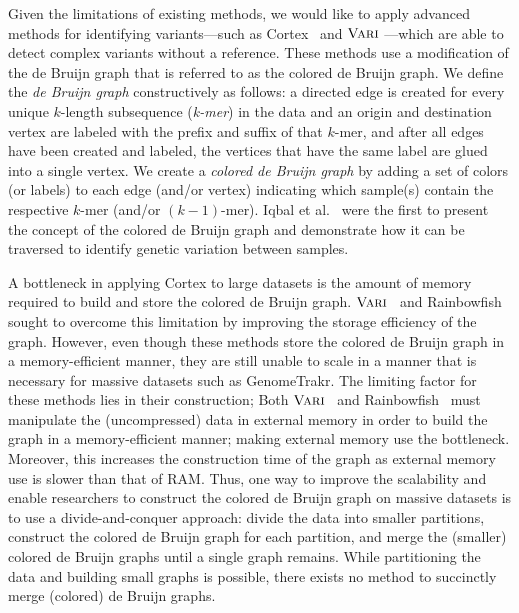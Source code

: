 Given the limitations of existing methods, we would like to apply advanced methods for identifying variants---such as Cortex~\cite{ICTFM12} and $\mbox{\rm {\sc Vari}}$ \cite{vari}---which are able to detect complex variants without a reference. These methods use a modification of the de Bruijn graph that is referred to as the colored de Bruijn graph.   We define the {\em de Bruijn graph} constructively as follows: a directed edge is created for every unique $k$-length subsequence ({\em k-mer}) in the data and an origin and destination vertex are labeled with the prefix and suffix of that $k$-mer, and after all edges have been created and labeled, the vertices that have the same label are glued into a single vertex.  We create a {\em colored de Bruijn graph} by adding a set of colors (or labels) to each edge (and/or vertex) indicating which sample(s) contain the respective $k$-mer (and/or $(k - 1)$-mer).  Iqbal et al.~\cite{ICTFM12} were the first to present the concept of the colored de Bruijn graph and demonstrate how it can be traversed to identify genetic variation between samples.

A bottleneck in applying Cortex to large datasets is the amount of memory required to build and store the colored de Bruijn graph.   $\mbox{\rm {\sc Vari}}$~\cite{vari} and Rainbowfish~\cite{rainbowfish} sought to overcome this limitation by improving the storage efficiency of the graph.  However, even though these methods store the colored de Bruijn graph in a memory-efficient manner, they are still unable to scale in a manner that is necessary for massive datasets such as GenomeTrakr.  The limiting factor for these methods  lies in their construction; Both $\mbox{\rm {\sc Vari}}$~\cite{vari} and Rainbowfish~\cite{rainbowfish} must manipulate the (uncompressed) data in external memory in order to build the graph in a memory-efficient manner; making  external memory use the bottleneck.  Moreover, this increases the construction time of the graph as external memory use is slower than that of RAM.  Thus, one way to improve the scalability and enable researchers to construct the colored de Bruijn graph on  massive datasets is to use a divide-and-conquer approach: divide the data into smaller partitions, construct the colored de Bruijn graph for each partition, and merge the (smaller) colored de Bruijn graphs until a single graph remains.  While partitioning the data and building small graphs is possible, there exists no method to succinctly merge (colored) de Bruijn graphs.


